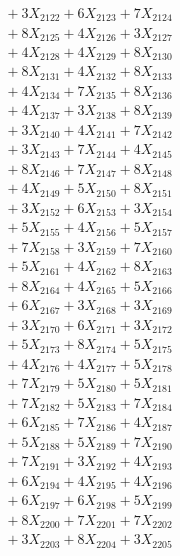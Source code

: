 \documentclass[a4paper,10pt]{article}
\begin{document}
{\begin{align}
&\;  + 3 X_{2122} + 6 X_{2123} + 7 X_{2124} \\[0.3ex]
&\;  + 8 X_{2125} + 4 X_{2126} + 3 X_{2127} \\[0.3ex]
&\;  + 4 X_{2128} + 4 X_{2129} + 8 X_{2130} \\[0.3ex]
&\;  + 8 X_{2131} + 4 X_{2132} + 8 X_{2133} \\[0.3ex]
&\;  + 4 X_{2134} + 7 X_{2135} + 8 X_{2136} \\[0.3ex]
&\;  + 4 X_{2137} + 3 X_{2138} + 8 X_{2139} \\[0.5ex]\allowbreak
&\;  + 3 X_{2140} + 4 X_{2141} + 7 X_{2142} \\[0.3ex]
&\;  + 3 X_{2143} + 7 X_{2144} + 4 X_{2145} \\[0.3ex]
&\;  + 8 X_{2146} + 7 X_{2147} + 8 X_{2148} \\[0.3ex]
&\;  + 4 X_{2149} + 5 X_{2150} + 8 X_{2151} \\[0.3ex]
&\;  + 3 X_{2152} + 6 X_{2153} + 3 X_{2154} \\[0.3ex]
&\;  + 5 X_{2155} + 4 X_{2156} + 5 X_{2157} \\[0.3ex]
&\;  + 7 X_{2158} + 3 X_{2159} + 7 X_{2160} \\[0.3ex]
&\;  + 5 X_{2161} + 4 X_{2162} + 8 X_{2163} \\[0.3ex]
&\;  + 8 X_{2164} + 4 X_{2165} + 5 X_{2166} \\[0.3ex]
&\;  + 6 X_{2167} + 3 X_{2168} + 3 X_{2169} \\[0.5ex]\allowbreak
&\;  + 3 X_{2170} + 6 X_{2171} + 3 X_{2172} \\[0.3ex]
&\;  + 5 X_{2173} + 8 X_{2174} + 5 X_{2175} \\[0.3ex]
&\;  + 4 X_{2176} + 4 X_{2177} + 5 X_{2178} \\[0.3ex]
&\;  + 7 X_{2179} + 5 X_{2180} + 5 X_{2181} \\[0.3ex]
&\;  + 7 X_{2182} + 5 X_{2183} + 7 X_{2184} \\[0.3ex]
&\;  + 6 X_{2185} + 7 X_{2186} + 4 X_{2187} \\[0.3ex]
&\;  + 5 X_{2188} + 5 X_{2189} + 7 X_{2190} \\[0.3ex]
&\;  + 7 X_{2191} + 3 X_{2192} + 4 X_{2193} \\[0.3ex]
&\;  + 6 X_{2194} + 4 X_{2195} + 4 X_{2196} \\[0.3ex]
&\;  + 6 X_{2197} + 6 X_{2198} + 5 X_{2199} \\[0.5ex]\allowbreak
&\;  + 8 X_{2200} + 7 X_{2201} + 7 X_{2202} \\[0.3ex]
&\;  + 3 X_{2203} + 8 X_{2204} + 3 X_{2205} \\[0.3ex]

\end{align}}
\end{document}
